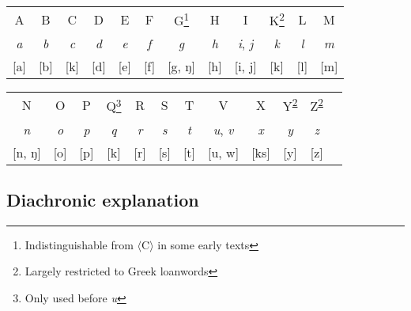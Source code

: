 \begin{example}
\centering
\vspace{\baselineskip}
\begin{tabular}{cccccccccccc}
A         & B        & C        & D        & E        & F        & G\footnote[1]{
    Indistinguishable from $\langle$C$\rangle$ in some early texts}             & H        & I                  & K\footnote[2]{ 
    Largely restricted to Greek loanwords\label{marge}}& L & M \\
\emph{a}  & \emph{b} & \emph{c} & \emph{d} & \emph{e} & \emph{f} & \emph{g} & \emph{h} & \emph{i}, \emph{j} & \emph{k} & \emph{l} & \emph{m} \\
\pad{}[a] & [b]      & [k]      & [d]      & [e]      & [f]      & [g, ŋ]   & [h]      & [i, j]             & [k]      & [l] & [m] \\
\end{tabular}

\vspace{\baselineskip}

\begin{tabular}{cccccccccccc}
N            & O        & P        & Q\footnote[3]{
    Only used before \emph{u}}                                       & R        & S        & T        & V                  & X        & Y\textsuperscript{\ref{marge}}                               & Z\textsuperscript{\ref{marge}} \\
\emph{n}     & \emph{o} & \emph{p} & \emph{q}                        & \emph{r} & \emph{s} & \emph{t} & \emph{u}, \emph{v} & \emph{x} & \emph{y} & \emph{z} \\
\pad{}[n, ŋ] & [o]      & [p]      & [k]                             & [r]      & [s]      & [t]      & [u, w]             & [ks]     & [y]      & [z] \\
\end{tabular}
\end{example}


\subsection{Diachronic explanation}

